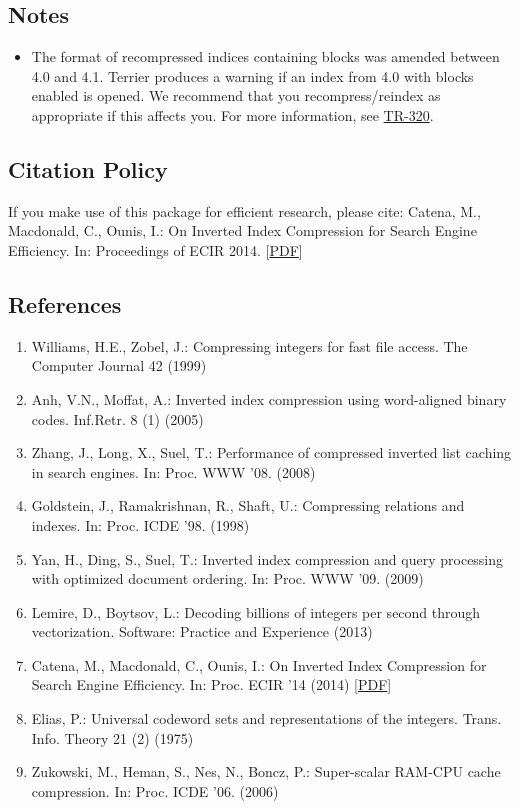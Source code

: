 \subsection{Notes}\label{notes}

\begin{itemize}
\tightlist
\item
  The format of recompressed indices containing blocks was amended
  between 4.0 and 4.1. Terrier produces a warning if an index from 4.0
  with blocks enabled is opened. We recommend that you
  recompress/reindex as appropriate if this affects you. For more
  information, see
  \href{http://terrier.org/issues/browse/TR-320}{TR-320}.
\end{itemize}

\subsection{Citation Policy}\label{citation-policy}

If you make use of this package for efficient research, please cite:
Catena, M., Macdonald, C., Ounis, I.: On Inverted Index Compression for
Search Engine Efficiency. In: Proceedings of ECIR 2014.
{[}\href{http://www.dcs.gla.ac.uk/~craigm/publications/catena14compression.pdf}{PDF}{]}

\subsection{References}\label{references}

\begin{enumerate}
\tightlist
\item
  Williams, H.E., Zobel, J.: Compressing integers for fast file access.
  The Computer Journal 42 (1999)
\item
  Anh, V.N., Moffat, A.: Inverted index compression using word-aligned
  binary codes. Inf.Retr. 8 (1) (2005)
\item
  Zhang, J., Long, X., Suel, T.: Performance of compressed inverted list
  caching in search engines. In: Proc. WWW '08. (2008)
\item
  Goldstein, J., Ramakrishnan, R., Shaft, U.: Compressing relations and
  indexes. In: Proc. ICDE '98. (1998)
\item
  Yan, H., Ding, S., Suel, T.: Inverted index compression and query
  processing with optimized document ordering. In: Proc. WWW '09. (2009)
\item
  Lemire, D., Boytsov, L.: Decoding billions of integers per second
  through vectorization. Software: Practice and Experience (2013)
\item
  Catena, M., Macdonald, C., Ounis, I.: On Inverted Index Compression
  for Search Engine Efficiency. In: Proc. ECIR '14 (2014)
  {[}\href{http://www.dcs.gla.ac.uk/~craigm/publications/catena14compression.pdf}{PDF}{]}
\item
  Elias, P.: Universal codeword sets and representations of the
  integers. Trans. Info. Theory 21 (2) (1975)
\item
  Zukowski, M., Heman, S., Nes, N., Boncz, P.: Super-scalar RAM-CPU
  cache compression. In: Proc. ICDE '06. (2006)
\end{enumerate}


